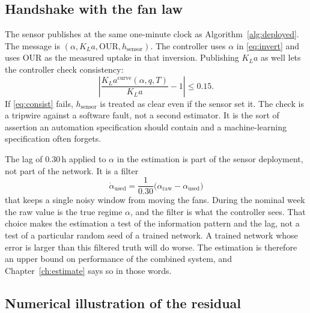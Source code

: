 \subsection{Handshake with the fan law}

The sensor publishes at the same one-minute clock as Algorithm~\ref{alg:deployed}. The message is $(\alpha, K_La, \mathrm{OUR}, h_{\mathrm{sensor}})$. The controller uses $\alpha$ in \eqref{eq:invert} and uses $\mathrm{OUR}$ as the measured uptake in that inversion. Publishing $K_La$ as well lets the controller check consistency:
\begin{equation}
\label{eq:consist}
\left|
\frac{K_La^{\mathrm{curve}}(\alpha,q,T)}{K_La}
-
1
\right|
\le
0.15.
\end{equation}
If \eqref{eq:consist} fails, $h_{\mathrm{sensor}}$ is treated as clear even if the sensor set it. The check is a tripwire against a software fault, not a second estimator. It is the sort of assertion an automation specification should contain and a machine-learning specification often forgets.

The lag of $0.30\,\mathrm{h}$ applied to $\alpha$ in the estimation is part of the sensor deployment, not part of the network. It is a filter
\begin{equation}
\label{eq:alpha-lag}
\dot{\alpha}_{\mathrm{used}}
=
\frac{1}{0.30}
\big(\alpha_{\mathrm{raw}}-\alpha_{\mathrm{used}}\big)
\end{equation}
that keeps a single noisy window from moving the fans. During the nominal week the raw value is the true regime $\alpha$, and the filter is what the controller sees. That choice makes the estimation a test of the information pattern and the lag, not a test of a particular random seed of a trained network. A trained network whose error is larger than this filtered truth will do worse. The estimation is therefore an upper bound on performance of the combined system, and Chapter~\ref{ch:estimate} says so in those words.

\subsection{Numerical illustration of the residual}

